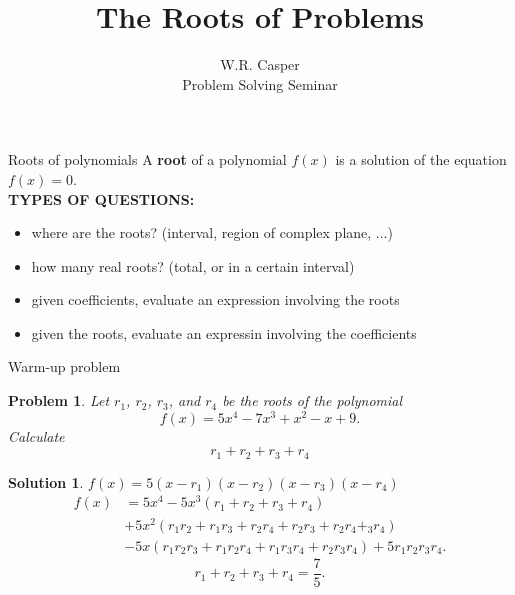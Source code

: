 \documentclass{beamer}
\title{The Roots of Problems}
\author[W.R. Casper] %
{W.R. Casper\\\vspace{0.2in}
 {\tiny Problem Solving Seminar}}
\institute[California State University Fullerton] %
{
  Department of Mathematics\\
  California State University Fullerton}
\newtheorem{prob}{Problem}
\newtheorem{soln}{Solution}
\begin{document}
\begin{frame}
  \titlepage
\end{frame}




\begin{frame}{Roots of polynomials}
A \textbf{root} of a polynomial $f(x)$ is a solution of the equation $f(x) = 0$.\\
\pause
\textbf{TYPES OF QUESTIONS:}
\begin{itemize}
\pause
\item where are the roots? (interval, region of complex plane, $\dots$)
\pause
\item how many real roots? (total, or in a certain interval)
\pause
\item given coefficients, evaluate an expression involving the roots
\pause
\item given the roots, evaluate an expressin involving the coefficients
\end{itemize}
\end{frame}

\begin{frame}{Warm-up problem}
\begin{prob}
Let $r_1$, $r_2$, $r_3$, and $r_4$ be the roots of the polynomial
$$f(x) = 5x^4 - 7x^3 + x^2 -x + 9.$$
Calculate
$$r_1 + r_2 + r_3 + r_4$$
\end{prob}
\pause
\begin{soln}
\pause
$f(x) = 5(x-r_1)(x-r_2)(x-r_3)(x-r_4)$
\pause
{\small
\begin{align*}
f(x)
  & = 5x^4 - 5x^3(r_1+r_2+r_3+r_4)\\
  & + 5x^2(r_1r_2+r_1r_3+r_2r_4+r_2r_3+r_2r_4+_3r_4)\\
  & - 5x(r_1r_2r_3+r_1r_2r_4+r_1r_3r_4+r_2r_3r_4) + 5r_1r_2r_3r_4.
\end{align*}
}
\pause
$$r_1 + r_2 + r_3 + r_4 = \frac{7}{5}.$$
\end{soln}
\end{frame}
\end{document}
